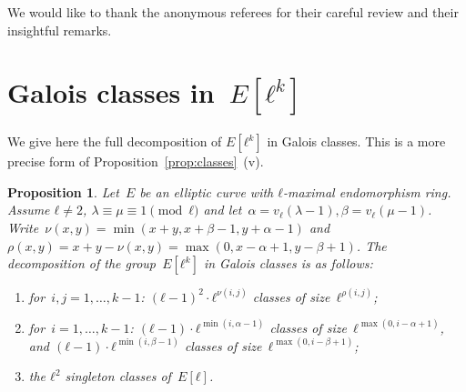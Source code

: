 \documentclass{lms}
\newcommand{\todo}[1]{{\color{red}TODO: #1}}
\newtheorem{prop}[thm]{Proposition}
\begin{document}
\begin{acknowledgments}
  We would like to thank the anonymous referees for their careful
  review and their insightful remarks.
\end{acknowledgments}





\appendix

\section{Galois classes in~$E[ℓ^k]$}
\label{ap:galois}

We give here the full decomposition of $E[ℓ^k]$ in Galois classes.
This is a more precise form of Proposition~\ref{prop:classes}~(v).
\begin{prop}\label{prop:orbites-l-torsion}
Let~$E$ be an elliptic curve with $ℓ$-maximal endomorphism ring.
Assume $ℓ ≠ 2$, $λ ≡ μ ≡ 1 \pmod{ℓ}$ and let~$α = v_ℓ(λ-1), β=v_ℓ(μ-1)$.
Write~$ν(x, y) = \min (x+y, x+β-1, y+α-1)$
and~$ρ(x, y) = x+y - ν(x, y) = \max (0, x-α+1, y-β+1)$.
The decomposition of the group~$E[ℓ^k]$ in Galois classes is as follows:
\begin{enumerate}
\item for~$i, j = 1, …, k-1$:
$(ℓ-1)^2 · ℓ^{ν(i,j)}$ classes of size~$ℓ^{ρ(i,j)}$;
\item for~$i = 1, …, k-1$:
$(ℓ-1) · ℓ^{\min (i, α-1)}$ classes of size~$ℓ^{\max (0, i-α+1)}$, and
$(ℓ-1) · ℓ^{\min (i, β-1)}$ classes of size~$ℓ^{\max (0, i-β+1)}$;
\item the $ℓ^2$ singleton classes of~$E[ℓ]$.
\end{enumerate}
\end{prop}
\end{document}
